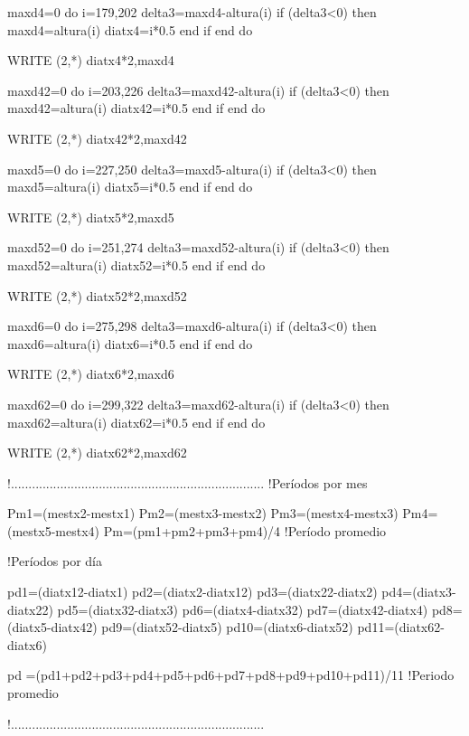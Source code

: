 maxd4=0
do i=179,202
delta3=maxd4-altura(i)
if (delta3<0) then
maxd4=altura(i)
diatx4=i*0.5
end if
end do

WRITE (2,*) diatx4*2,maxd4

maxd42=0
do i=203,226
delta3=maxd42-altura(i)
if (delta3<0) then
maxd42=altura(i)
diatx42=i*0.5
end if
end do

WRITE (2,*) diatx42*2,maxd42

maxd5=0
do i=227,250
delta3=maxd5-altura(i)
if (delta3<0) then
maxd5=altura(i)
diatx5=i*0.5
end if
end do

WRITE (2,*) diatx5*2,maxd5

maxd52=0
do i=251,274
delta3=maxd52-altura(i)
if (delta3<0) then
maxd52=altura(i)
diatx52=i*0.5
end if
end do

WRITE (2,*) diatx52*2,maxd52

maxd6=0
do i=275,298
delta3=maxd6-altura(i)
if (delta3<0) then
maxd6=altura(i)
diatx6=i*0.5
end if
end do

WRITE (2,*) diatx6*2,maxd6

maxd62=0
do i=299,322
delta3=maxd62-altura(i)
if (delta3<0) then
maxd62=altura(i)
diatx62=i*0.5
end if
end do

WRITE (2,*) diatx62*2,maxd62

!........................................................................
!Períodos por mes

Pm1=(mestx2-mestx1)
Pm2=(mestx3-mestx2)
Pm3=(mestx4-mestx3)
Pm4=(mestx5-mestx4)
Pm=(pm1+pm2+pm3+pm4)/4 !Período promedio

!Períodos por día

pd1=(diatx12-diatx1)
pd2=(diatx2-diatx12)
pd3=(diatx22-diatx2)
pd4=(diatx3-diatx22)
pd5=(diatx32-diatx3)
pd6=(diatx4-diatx32)
pd7=(diatx42-diatx4)
pd8=(diatx5-diatx42)
pd9=(diatx52-diatx5)
pd10=(diatx6-diatx52)
pd11=(diatx62-diatx6)

pd =(pd1+pd2+pd3+pd4+pd5+pd6+pd7+pd8+pd9+pd10+pd11)/11 !Periodo promedio

!........................................................................


